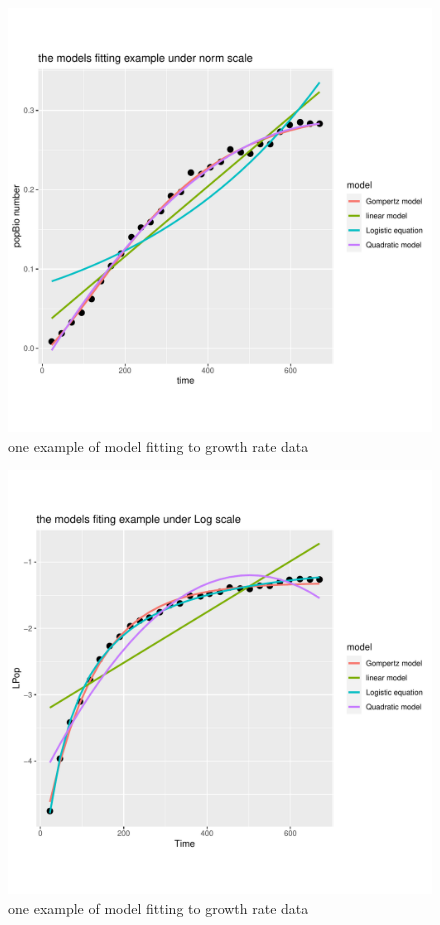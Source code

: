 \documentclass[11pt]{article}
\begin{document}
\begin{figure}[H]
    \centering
    \includegraphics[scale=0.4]{example1.pdf}
    \caption{one example of model fitting to growth rate data}
    \label{fig.1.1}
\end{figure}

\begin{figure}[H]
    \centering
    \includegraphics[scale=0.4]{example2.pdf}
    \caption{one example of model fitting to growth rate data}
    \label{fig.1.2}
\end{figure}
\end{document}
